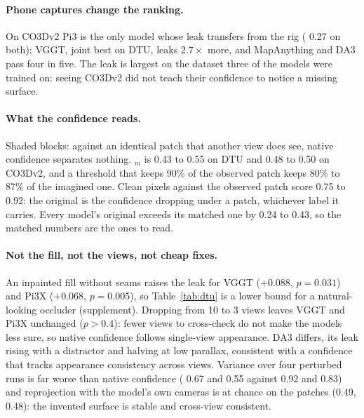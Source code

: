 \documentclass[10pt,twocolumn,letterpaper]{article}
\begin{document}
\paragraph{Phone captures change the ranking.}
On CO3Dv2 Pi3 is the only model whose leak transfers from the rig (\cur{} 0.27 on both); VGGT, joint best on DTU, leaks $2.7\times$ more, and MapAnything and DA3 pass four in five. The leak is largest on the dataset three of the models were trained on: seeing CO3Dv2 did not teach their confidence to notice a missing surface.

\paragraph{What the confidence reads.}
Shaded blocks: against an identical patch that another view does see, native confidence separates nothing. \auroc$_m$ is 0.43 to 0.55 on DTU and 0.48 to 0.50 on CO3Dv2, and a threshold that keeps 90\% of the observed patch keeps 80\% to 87\% of the imagined one. Clean pixels against the observed patch score 0.75 to 0.92: the original \auroc{} is the confidence dropping under a patch, whichever label it carries. Every model's original \auroc{} exceeds its matched one by 0.24 to 0.43, so the matched numbers are the ones to read.

\paragraph{Not the fill, not the views, not cheap fixes.}
An inpainted fill without seams raises the leak for VGGT ($+0.088$, $p=0.031$) and Pi3X ($+0.068$, $p=0.005$), so Table~\ref{tab:dtu} is a lower bound for a natural-looking occluder (supplement). Dropping from 10 to 3 views leaves VGGT and Pi3X unchanged ($p>0.4$): fewer views to cross-check do not make the models less sure, so native confidence follows single-view appearance. DA3 differs, its leak rising with a distractor and halving at low parallax, consistent with a confidence that tracks appearance consistency across views. Variance over four perturbed runs is far worse than native confidence (\auroc{} 0.67 and 0.55 against 0.92 and 0.83) and reprojection with the model's own cameras is at chance on the patches (0.49, 0.48): the invented surface is stable and cross-view consistent.

\end{document}
